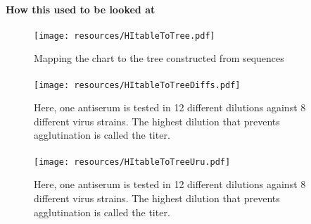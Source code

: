 \documentclass{beamer}
\begin{document}
\begin{darkframes}
    \begin{frame}{\subsecname}
      \framesubtitle{How this used to be looked at}
    \end{frame}

    \begin{frame}{\subsecname}
      \framesubtitle{}
      \begin{figure}
        \texttt{[image: resources/HItableToTree.pdf]}
        \caption{\footnotesize Mapping the chart to the tree constructed from sequences}
      \end{figure}
    \end{frame}

    \begin{frame}{\subsecname}
      \framesubtitle{}
      \begin{figure}
        \texttt{[image: resources/HItableToTreeDiffs.pdf]}
        \caption{\footnotesize Here, one antiserum is tested in 12 different dilutions against 8 different virus strains. The highest dilution that prevents agglutination is called the titer.}
      \end{figure}
    \end{frame}

    \begin{frame}{\subsecname}
      \framesubtitle{}
      \begin{figure}
        \texttt{[image: resources/HItableToTreeUru.pdf]}
        \caption{\footnotesize Here, one antiserum is tested in 12 different dilutions against 8 different virus strains. The highest dilution that prevents agglutination is called the titer.}
      \end{figure}
    \end{frame}


\end{darkframes}
\end{document}
